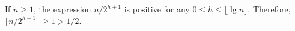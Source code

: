 If $n\ge1$, the expression $n/2^{h+1}$ is positive for any $0\le h\le\lfloor\lg n\rfloor$.
Therefore, $\bigl\lceil n/2^{h+1}\bigr\rceil\ge1>1/2$.
